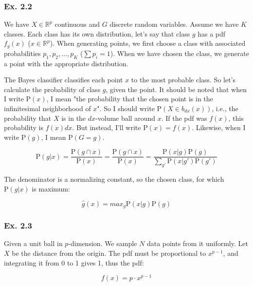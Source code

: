 \documentclass{article}
\begin{document}
\subsubsection{Ex. 2.2}

We have $X \in \mathbb{R}^p$ continuous and $G$ discrete random variables. Assume we have $K$ classes. Each class has its own distribution, let's say that class $g$ has a pdf $f_{g}(x)$ ($x \in \mathbb{R}^p$). When generating points, we first choose a class with associated probabilities $p_1, p_2, \dots, p_K$ ($\sum p_i = 1$). When we have chosen the class, we generate a point with the appropriate distribution.

The Bayes classifier classifies each point $x$ to the most probable class. So let's calculate the probability of class $g$, given the point. It should be noted that when I write $\text{P}(x)$, I mean "the probability that the chosen point is in the infinitesimal neighborhood of $x$". So I should write $\text{P}(X \in b_{dx}(x))$, i.e., the probability that $X$ is in the $dx$-volume ball around $x$. If the pdf was $f(x)$, this probability is $f(x)dx$. But instead, I'll write $\text{P}(x) = f(x)$. Likewise, when I write $\text{P}(g)$, I mean $\text{P}(G=g)$.

\begin{equation}
    \text{P}(g|x) = \frac{\text{P}(g \cap x)}{\text{P}(x)} = \frac{\text{P}(g \cap x)}{\text{P}(x)} = \frac{\text{P}(x | g) \text{P}(g)}{\sum_{g'}\text{P}(x|g') \text{P}(g')}
\end{equation}

The denominator is a normalizing constant, so the chosen class, for which $\text{P}(g|x)$ is maximum:

\begin{equation}
    \hat{g}(x) = max_{g} \text{P} (x|g) \text{P}(g)
\end{equation}

\subsubsection{Ex. 2.3}

Given a unit ball in $p$-dimension. We sample $N$ data points from it uniformly. Let $X$ be the distance from the origin. The pdf must be proportional to $x^{p-1}$, and integrating it from 0 to 1 gives 1, thus the pdf:

\begin{equation}
    f(x) = p\cdot x^{p-1}
\end{equation}
\end{document}
